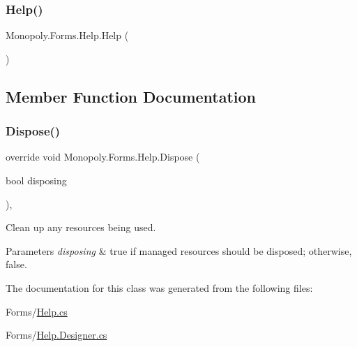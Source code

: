 \subsubsection{\texorpdfstring{Help()}{Help()}}
{\footnotesize\ttfamily Monopoly.\+Forms.\+Help.\+Help (\begin{DoxyParamCaption}{ }\end{DoxyParamCaption})\hspace{0.3cm}{\ttfamily [inline]}}



\subsection{Member Function Documentation}
\mbox{\label{class_monopoly_1_1_forms_1_1_help_aa601c3f000dea4c814dac14e8836d708}} 
\subsubsection{\texorpdfstring{Dispose()}{Dispose()}}
{\footnotesize\ttfamily override void Monopoly.\+Forms.\+Help.\+Dispose (\begin{DoxyParamCaption}\item[{bool}]{disposing }\end{DoxyParamCaption})\hspace{0.3cm}{\ttfamily [inline]}, {\ttfamily [protected]}}



Clean up any resources being used. 


\begin{DoxyParams}{Parameters}
{\em disposing} & true if managed resources should be disposed; otherwise, false.\\
\hline
\end{DoxyParams}


The documentation for this class was generated from the following files\+:\begin{DoxyCompactItemize}
\item 
Forms/\mbox{\hyperlink{_help_8cs}{Help.\+cs}}\item 
Forms/\mbox{\hyperlink{_help_8_designer_8cs}{Help.\+Designer.\+cs}}\end{DoxyCompactItemize}
